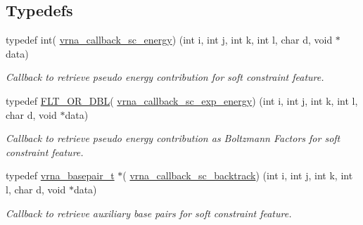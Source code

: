 \subsection*{Typedefs}
\begin{DoxyCompactItemize}
\item 
typedef int( \hyperlink{group__generalized__sc_gaf38062858ac25fd5e240c2c3b0b0b780}{vrna\+\_\+callback\+\_\+sc\+\_\+energy}) (int i, int j, int k, int l, char d, void $\ast$data)
\begin{DoxyCompactList}\small\item\em Callback to retrieve pseudo energy contribution for soft constraint feature. \end{DoxyCompactList}\item 
typedef \hyperlink{group__data__structures_ga31125aeace516926bf7f251f759b6126}{F\+L\+T\+\_\+\+O\+R\+\_\+\+D\+B\+L}( \hyperlink{group__generalized__sc_ga2eade8745c163a553763be4cfe2a679b}{vrna\+\_\+callback\+\_\+sc\+\_\+exp\+\_\+energy}) (int i, int j, int k, int l, char d, void $\ast$data)
\begin{DoxyCompactList}\small\item\em Callback to retrieve pseudo energy contribution as Boltzmann Factors for soft constraint feature. \end{DoxyCompactList}\item 
typedef \hyperlink{group__data__structures_gac8c5669d3fb813cacf506489689305ce}{vrna\+\_\+basepair\+\_\+t} $\ast$( \hyperlink{group__generalized__sc_gaa216f513c3b0bd6fe5807dd0c53a8e5a}{vrna\+\_\+callback\+\_\+sc\+\_\+backtrack}) (int i, int j, int k, int l, char d, void $\ast$data)
\begin{DoxyCompactList}\small\item\em Callback to retrieve auxiliary base pairs for soft constraint feature. \end{DoxyCompactList}\end{DoxyCompactItemize}
